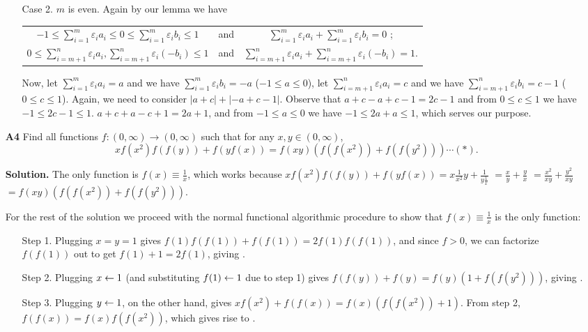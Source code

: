 \documentclass[11pt,a4paper]{article}
\begin{document}
\begin{itemize}
\begin{itemize}
\item [Case 2.] $m$ is even. 
 Again by our lemma we have 
\begin{center}
\begin{tabular}{c c c} 
$-1\le \sum_{i=1}^m \varepsilon_i a_i\le 0\le \sum_{i=1}^m \varepsilon_i b_i\le 1$
& and & $\sum_{i=1}^m \varepsilon_i a_i +\sum_{i=1}^m \varepsilon_i b_i=0$ ; \\ 
$0\le \sum_{i=m+1}^n \varepsilon_i a_i,  \sum_{i=m+1}^n \varepsilon_i (-b_i)\le 1$
& and & $\sum_{i=m+1}^n \varepsilon_i a_i +\sum_{i=m+1}^n \varepsilon_i (-b_i)=1$. \\ 
\end{tabular} 
\end{center}
Now, let $\sum_{i=1}^m \varepsilon_i a_i=a$ and we have $\sum_{i=1}^m \varepsilon_i b_i=-a$ ($-1\le a\le 0$), 
let $\sum_{i=m+1}^n \varepsilon_i a_i=c$ and we have $\sum_{i=m+1}^n \varepsilon_i b_i=c-1$ ($0\le c\le 1$). 
Again, we need to consider $|a+c|+|-a+c-1|$. 
Observe that $a+c-a+c-1=2c-1$ and from $0\le c\le 1$ we have $-1\le 2c-1\le 1$. 
$a+c+a-c+1=2a+1$, and from $-1\le a\le 0$ we have $-1\le 2a+a\le 1$, which serves our purpose. 
\end{itemize}

\item[\textbf{A4}]
Find all functions $f:(0,\infty)\rightarrow (0,\infty)$ such that for any $x,y\in (0,\infty)$, $$xf(x^2)f(f(y)) + f(yf(x)) = f(xy) \left(f(f(x^2)) + f(f(y^2))\right)\cdots (*).$$

\textbf{Solution.} 
The only function is $f(x)\equiv \frac 1x$, which works because 
$xf(x^2)f(f(y)) + f(yf(x))=x\frac1 {x^2} y+\frac 1 {y\frac 1{x}}$
$=\frac xy+\frac yx$
$=\frac{x^2}{xy}+\frac{y^2}{xy}$
$=f(xy)\left(f(f(x^2)) + f(f(y^2))\right)$. 

For the rest of the solution we proceed with the normal functional algorithmic procedure to show that $f(x)\equiv \frac 1x$ is the only function: 
\begin{itemize}
\item [Step 1.] 
Plugging $x=y=1$ gives $f(1)f(f(1))+f(f(1))=2f(1)f(f(1))$, 
and since $f>0$, we can factorize $f(f(1))$ out to get $f(1)+1=2f(1)$, giving . 

\item [Step 2.]
Plugging $x\leftarrow 1$ (and substituting $f(1)\leftarrow 1$ due to step 1) gives $f(f(y))+f(y)=f(y)(1+f(f(y^2)))$, 
giving . 

\item [Step 3.]
Plugging $y\leftarrow 1$, on the other hand, gives 
$xf(x^2)+f(f(x))=f(x)(f(f(x^2))+1)$. 
From step 2, $f(f(x))=f(x)f(f(x^2))$, 
which gives rise to . 


\end{itemize}
\end{itemize}
\end{document}
